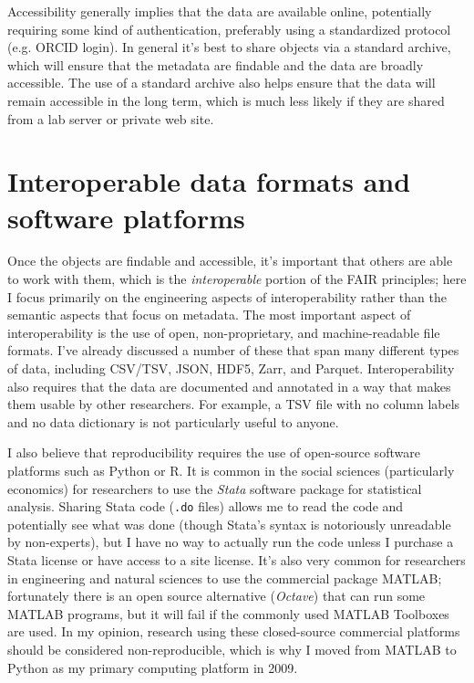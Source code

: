 Accessibility generally implies that the data are available online, potentially requiring some kind of authentication, preferably using a standardized protocol (e.g. ORCID login). In general it's best to share objects via a standard archive, which will ensure that the metadata are findable and the data are broadly accessible.  The use of a standard archive also helps ensure that the data will remain accessible in the long term, which is much less likely if they are shared from a lab server or private web site.

\section{Interoperable data formats and software platforms}

Once the objects are findable and accessible, it's important that others are able to work with them, which is the \textit{interoperable} portion of the FAIR principles; here I focus primarily on the engineering aspects of interoperability rather than the semantic aspects that focus on metadata.  The most important aspect of interoperability is the use of open, non-proprietary, and machine-readable file formats. I've already discussed a number of these that span many different types of data, including CSV/TSV, JSON, HDF5, Zarr, and Parquet.  Interoperability also requires that the data are documented and annotated in a way that makes them usable by other researchers. For example, a TSV file with no column labels and no data dictionary is not particularly useful to anyone.

I also believe that reproducibility requires the use of open-source software platforms such as Python or R.  It is common in the social sciences (particularly economics) for researchers to use the \textit{Stata} software package for statistical analysis.  Sharing Stata code (\texttt{.do} files) allows me to read the code and potentially see what was done (though Stata's syntax is notoriously unreadable by non-experts), but I have no way to actually run the code unless I purchase a Stata license or have access to a site license. It's also very common for researchers in engineering and natural sciences to use the commercial package MATLAB; fortunately there is an open source alternative (\textit{Octave}) that can run some MATLAB programs, but it will fail if the commonly used MATLAB Toolboxes are used. In my opinion, research using these closed-source commercial platforms should be considered non-reproducible, which is why I moved from MATLAB to Python as my primary computing platform in 2009.

